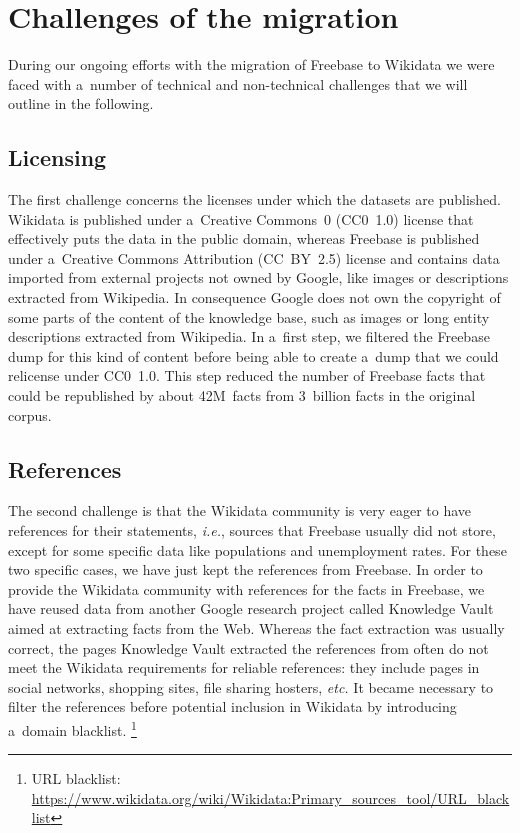 \documentclass{acm_proc_article-sp}
\begin{document}
\section{Challenges of the migration}\label{sec:challenges-of-the-migration}

During our ongoing efforts with the migration of Freebase to Wikidata
we were faced with a~number of technical and non-technical challenges
that we will outline in the following.

\subsection{Licensing}
\label{sec:licensing}

The first challenge concerns the licenses under which the datasets are published.
Wikidata is published under a~Creative Commons~0 (CC0~1.0) license
that effectively puts the data in the public domain,
whereas Freebase is published under a~Creative Commons Attribution (CC~BY~2.5) license
and contains data imported from external projects not owned by Google,
like images or descriptions extracted from Wikipedia.
In consequence Google does not own the copyright of some parts of the content of the knowledge base,
such as images or long entity descriptions extracted from Wikipedia.
In a~first step, we filtered the Freebase dump for this kind of content
before being able to create a~dump that we could relicense under CC0~1.0.
This step reduced the number of Freebase facts that could be republished by about 42M~facts
from 3~billion facts in the original corpus.

\subsection{References}

The second challenge is that the Wikidata community is very eager to have references
for their statements, \emph{i.e.}, sources that Freebase usually did not store,
except for some specific data like populations and unemployment rates.
For these two specific cases, we have just kept the references from Freebase.
In order to provide the Wikidata community with references for the facts in Freebase,
we have reused data from another Google research project
called Knowledge Vault~\cite{dong2014knowledge} aimed at extracting facts from the Web.
Whereas the fact extraction was usually correct, the pages Knowledge Vault extracted
the references from often do not meet the Wikidata requirements for reliable references:
they include pages in social networks, shopping sites, file sharing hosters, \emph{etc.}
It became necessary to filter the references before potential inclusion in Wikidata
by introducing a~domain blacklist.%
\footnote{URL blacklist:
\url{https://www.wikidata.org/wiki/Wikidata:Primary_sources_tool/URL_blacklist}}
\end{document}
